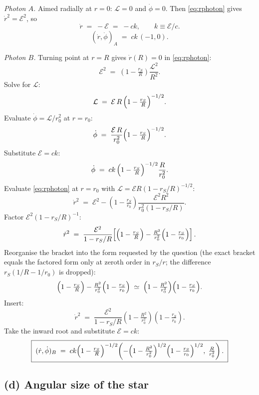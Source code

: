\documentclass[11pt]{article}
\begin{document}
\textit{Photon $A$.} Aimed radially at $r=0$: $\mathcal L=0$ and $\dot\phi=0$. Then \eqref{eq:rphoton} gives $\dot r^2=\mathcal E^2$, so
\[
\dot r \;=\; -\mathcal E \;=\; -ck,\qquad k\equiv\mathcal E/c.
\]
\begin{equation}
\boxed{\;(\dot r,\dot\phi)_A \;=\; ck\,(-1,0).\;}
\label{eq:A}
\end{equation}

\textit{Photon $B$.} Turning point at $r=R$ gives $\dot r(R)=0$ in \eqref{eq:rphoton}:
\[
\mathcal E^2 \;=\; \left(1-\tfrac{r_S}{R}\right)\frac{\mathcal L^2}{R^2}.
\]
Solve for $\mathcal L$:
\[
\mathcal L \;=\; \mathcal E\,R\,\Bigl(1-\tfrac{r_S}{R}\Bigr)^{-1/2}.
\]
Evaluate $\dot\phi=\mathcal L/r_0^2$ at $r=r_0$:
\[
\dot\phi \;=\; \frac{\mathcal E\,R}{r_0^2}\Bigl(1-\tfrac{r_S}{R}\Bigr)^{-1/2}.
\]
Substitute $\mathcal E=ck$:
\[
\dot\phi \;=\; ck\,\Bigl(1-\tfrac{r_S}{R}\Bigr)^{-1/2}\frac{R}{r_0^2}.
\]
Evaluate \eqref{eq:rphoton} at $r=r_0$ with $\mathcal L=\mathcal ER(1-r_S/R)^{-1/2}$:
\[
\dot r^2 \;=\; \mathcal E^2 - \left(1-\tfrac{r_S}{r_0}\right)\frac{\mathcal E^2 R^2}{r_0^2(1-r_S/R)}.
\]
Factor $\mathcal E^2(1-r_S/R)^{-1}$:
\[
\dot r^2 \;=\; \frac{\mathcal E^2}{1-r_S/R}\!\left[\Bigl(1-\tfrac{r_S}{R}\Bigr) - \tfrac{R^2}{r_0^2}\Bigl(1-\tfrac{r_S}{r_0}\Bigr)\right].
\]
Reorganise the bracket into the form requested by the question (the exact bracket equals the factored form only at zeroth order in $r_S/r$; the difference $r_S(1/R-1/r_0)$ is dropped):
\[
\Bigl(1-\tfrac{r_S}{R}\Bigr) - \tfrac{R^2}{r_0^2}\Bigl(1-\tfrac{r_S}{r_0}\Bigr) \;\simeq\; \Bigl(1-\tfrac{R^2}{r_0^2}\Bigr)\Bigl(1-\tfrac{r_S}{r_0}\Bigr).
\]
Insert:
\[
\dot r^2 \;=\; \frac{\mathcal E^2}{1-r_S/R}\!\left(1-\tfrac{R^2}{r_0^2}\right)\!\left(1-\tfrac{r_S}{r_0}\right).
\]
Take the inward root and substitute $\mathcal E=ck$:
\begin{equation}
\boxed{\;(\dot r,\dot\phi)_B \;=\; ck\Bigl(1-\tfrac{r_S}{R}\Bigr)^{-1/2}\!\left(-\Bigl(1-\tfrac{R^2}{r_0^2}\Bigr)^{1/2}\Bigl(1-\tfrac{r_S}{r_0}\Bigr)^{1/2},\;\tfrac{R}{r_0^2}\right).\;}
\label{eq:B}
\end{equation}

\subsection*{(d) Angular size of the star}
\end{document}
